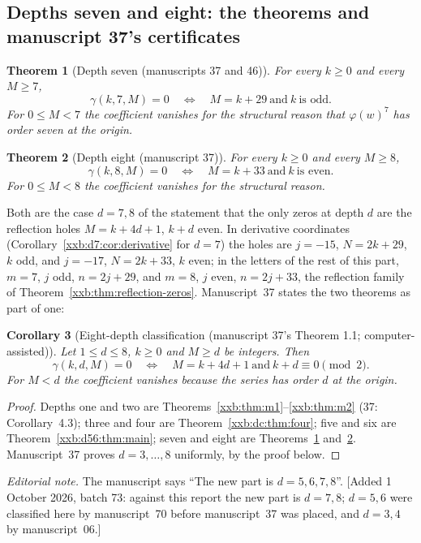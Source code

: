 \documentclass[11pt,a4paper]{article}
\numberwithin{equation}{section}
\newtheorem{theorem}{Theorem}[section]
\newtheorem{corollary}[theorem]{Corollary}
\theoremstyle{definition}
\theoremstyle{remark}
\theoremstyle{plain}
\begin{document}
\subsection{Depths seven and eight: the theorems and manuscript 37's certificates}\label{xxb:d78:sec:certificates}

\begin{theorem}[Depth seven (manuscripts 37 and 46)]\label{xxb:d78:thm:seven}
For every $k\ge0$ and every $M\ge7$,
\begin{equation}\label{xxb:d78:eq:seven}
 \gamma(k,7,M)=0\quad\Longleftrightarrow\quad M=k+29\ \text{and}\ k\ \text{is odd}.
\end{equation}
For $0\le M<7$ the coefficient vanishes for the structural reason that
$\varphi(w)^7$ has order seven at the origin.
\end{theorem}

\begin{theorem}[Depth eight (manuscript 37)]\label{xxb:d78:thm:eight}
For every $k\ge0$ and every $M\ge8$,
\begin{equation}\label{xxb:d78:eq:eight}
 \gamma(k,8,M)=0\quad\Longleftrightarrow\quad M=k+33\ \text{and}\ k\ \text{is even}.
\end{equation}
For $0\le M<8$ the coefficient vanishes for the structural reason.
\end{theorem}

Both are the case $d=7,8$ of the statement that the only zeros at depth $d$
are the reflection holes $M=k+4d+1$, $k+d$ even.  In derivative coordinates
(Corollary~\ref{xxb:d7:cor:derivative} for $d=7$) the holes are
$j=-15$, $N=2k+29$, $k$ odd, and $j=-17$, $N=2k+33$, $k$ even; in the letters
of the rest of this part, $m=7$, $j$ odd, $n=2j+29$, and $m=8$, $j$ even,
$n=2j+33$, the reflection family of Theorem~\ref{xxb:thm:reflection-zeros}.
Manuscript~37 states the two theorems as part of one:

\begin{corollary}[Eight-depth classification (manuscript 37's Theorem 1.1; computer-assisted)]\label{xxb:d78:cor:eightdepths}
Let $1\le d\le8$, $k\ge0$ and $M\ge d$ be integers.  Then
\begin{equation}\label{xxb:d78:eq:classification}
 \gamma(k,d,M)=0\quad\Longleftrightarrow\quad M=k+4d+1\ \text{and}\ k+d\equiv0\pmod2.
\end{equation}
For $M<d$ the coefficient vanishes because the series has order $d$ at the
origin.
\end{corollary}
\begin{proof}
Depths one and two are Theorems~\ref{xxb:thm:m1}--\ref{xxb:thm:m2} (37:
Corollary~4.3); three and four are Theorem~\ref{xxb:dc:thm:four}; five and six
are Theorem~\ref{xxb:d56:thm:main}; seven and eight are
Theorems~\ref{xxb:d78:thm:seven} and~\ref{xxb:d78:thm:eight}.  Manuscript~37
proves $d=3,\ldots,8$ uniformly, by the proof below.
\end{proof}
\emph{Editorial note.}  The manuscript says ``The new part is $d=5,6,7,8$''.
[Added 1 October 2026, batch 73: against this report the new part is $d=7,8$;
$d=5,6$ were classified here by manuscript~70 before manuscript~37 was
placed, and $d=3,4$ by manuscript~06.]
\end{document}
